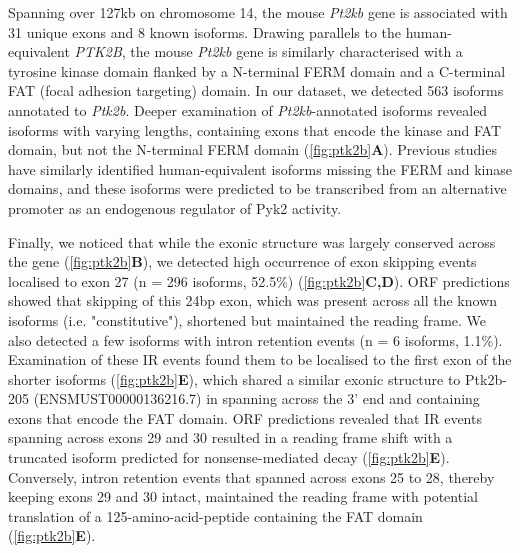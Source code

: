 Spanning over 127kb on chromosome 14, the mouse \textit{Pt2kb} gene is associated with 31 unique exons and 8 known isoforms. Drawing parallels to the human-equivalent \textit{PTK2B}, the mouse \textit{Pt2kb} gene is similarly characterised with a tyrosine kinase domain flanked by a N-terminal FERM domain and a C-terminal FAT (focal adhesion targeting) domain\cite{DePins2021}. In our dataset, we detected 563 isoforms annotated to \textit{Ptk2b}. Deeper examination of \textit{Pt2kb}-annotated isoforms revealed isoforms with varying lengths, containing exons that encode the kinase and FAT domain, but not the N-terminal FERM domain (\cref{fig:ptk2b}\textbf{A}). Previous studies have similarly identified human-equivalent isoforms missing the FERM and kinase domains\cite{DePins2021}, and these isoforms were predicted to be transcribed from an alternative promoter as an endogenous regulator of Pyk2 activity\cite{DePins2021}.

Finally, we noticed that while the exonic structure was largely conserved across the gene (\cref{fig:ptk2b}\textbf{B}), we detected high occurrence of exon skipping events localised to exon 27 (n = 296 isoforms, 52.5\%) (\cref{fig:ptk2b}\textbf{C,D}). ORF predictions showed that skipping of this 24bp exon, which was present across all the known isoforms (i.e. "constitutive"), shortened but maintained the reading frame. We also detected a few isoforms with intron retention events (n = 6 isoforms, 1.1\%). Examination of these IR events found them to be localised to the first exon of the shorter isoforms  (\cref{fig:ptk2b}\textbf{E}), which shared a similar exonic structure to Ptk2b-205 (ENSMUST00000136216.7) in spanning across the 3' end and containing exons that encode the FAT domain. ORF predictions revealed that IR events spanning across exons 29 and 30 resulted in a reading frame shift with a truncated isoform predicted for nonsense-mediated decay (\cref{fig:ptk2b}\textbf{E}). Conversely, intron retention events that spanned across exons 25 to 28, thereby keeping exons 29 and 30 intact, maintained the reading frame with potential translation of a 125-amino-acid-peptide containing the FAT domain (\cref{fig:ptk2b}\textbf{E}). 


